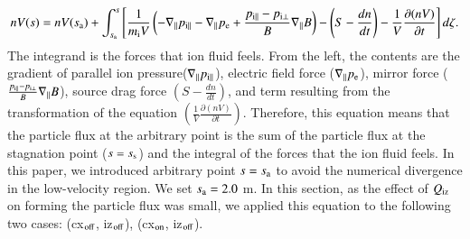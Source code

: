 \documentclass{jasse}%
\begin{document}
\small
\begin{align}
    nV(s) = nV(s_{\rm{a}}) + \int_{s_{\rm{a}}}^{s} \left[\frac{1}{m_{\rm{i}}V}\left(-\nabla_{\parallel} p_{\rm{i}\parallel} -\nabla_{\parallel} p_{\rm{e}} +\frac{p_{\rm{i}\parallel}-p_{\rm{i}\bot}}{B}\nabla_{\parallel} B \right) - \left(S - \frac{d n}{d t}\right) -\frac{1}{V}\frac{\partial (nV)}{\partial t} \right] d\zeta.\label{eq.f_balance}
\end{align}
\normalsize
The integrand is the forces that ion fluid feels. From the left, the contents are the gradient of parallel ion pressure($\nabla_{\parallel} p_{\rm{i}\parallel}$), electric field force ($\nabla_{\parallel} p_{\rm{e}}$), mirror force ($\frac{p_{\rm{i}\parallel}-p_{\rm{i}\bot}}{B}\nabla_{\parallel} B$), source drag force $\left(S - \frac{d n}{d t}\right)$, and term resulting from the transformation of the equation $\left(\frac{1}{V}\frac{\partial (nV)}{\partial t}\right)$. Therefore, this equation means that the particle flux at the arbitrary point is the sum of the particle flux at the stagnation point ($s = s_{\rm{s}}$) and the integral of the forces that the ion fluid feels. In this paper, we introduced arbitrary point $s = s_{\rm{a}}$ to avoid the numerical divergence in the low-velocity region. We set $s_{\rm{a}} = 2.0$ m.
In this section, as the effect of $Q_{\rm{iz}}$ on forming the particle flux was small, we applied this equation to the following two cases: (cx$_{\rm{off}}$, iz$_{\rm{off}}$), (cx$_{\rm{on}}$, iz$_{\rm{off}}$). 
\end{document}
